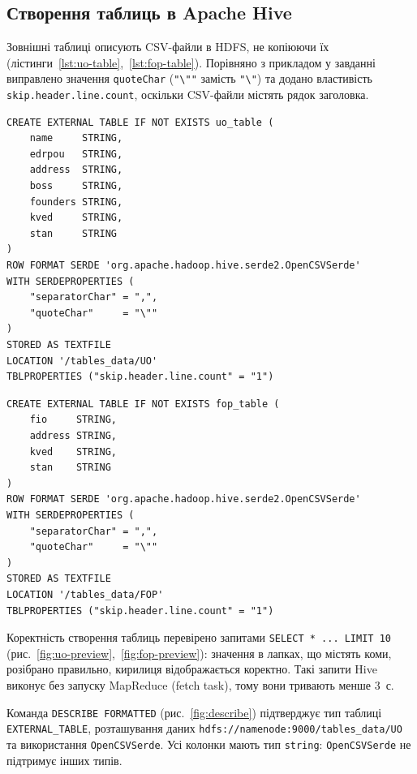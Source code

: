 \documentclass{iasa-lab}
\begin{document}

\subsection{Створення таблиць в Apache Hive}

Зовнішні таблиці описують CSV-файли в HDFS, не копіюючи їх (лістинги~\ref{lst:uo-table},~\ref{lst:fop-table}). Порівняно з прикладом у завданні виправлено значення \texttt{quoteChar} (\verb|"\""| замість \verb|"\"|) та додано властивість \texttt{skip.header.line.count}, оскільки CSV-файли містять рядок заголовка.

\begin{lstlisting}[language=HiveQL, caption={Створення зовнішньої таблиці uo\_table}, label={lst:uo-table}]
CREATE EXTERNAL TABLE IF NOT EXISTS uo_table (
    name     STRING,
    edrpou   STRING,
    address  STRING,
    boss     STRING,
    founders STRING,
    kved     STRING,
    stan     STRING
)
ROW FORMAT SERDE 'org.apache.hadoop.hive.serde2.OpenCSVSerde'
WITH SERDEPROPERTIES (
    "separatorChar" = ",",
    "quoteChar"     = "\""
)
STORED AS TEXTFILE
LOCATION '/tables_data/UO'
TBLPROPERTIES ("skip.header.line.count" = "1")
\end{lstlisting}

\begin{lstlisting}[language=HiveQL, caption={Створення зовнішньої таблиці fop\_table}, label={lst:fop-table}]
CREATE EXTERNAL TABLE IF NOT EXISTS fop_table (
    fio     STRING,
    address STRING,
    kved    STRING,
    stan    STRING
)
ROW FORMAT SERDE 'org.apache.hadoop.hive.serde2.OpenCSVSerde'
WITH SERDEPROPERTIES (
    "separatorChar" = ",",
    "quoteChar"     = "\""
)
STORED AS TEXTFILE
LOCATION '/tables_data/FOP'
TBLPROPERTIES ("skip.header.line.count" = "1")
\end{lstlisting}

Коректність створення таблиць перевірено запитами \texttt{SELECT * ... LIMIT 10} (рис.~\ref{fig:uo-preview},~\ref{fig:fop-preview}): значення в лапках, що містять коми, розібрано правильно, кирилиця відображається коректно. Такі запити Hive виконує без запуску MapReduce (fetch task), тому вони тривають менше 3~с.



Команда \texttt{DESCRIBE FORMATTED} (рис.~\ref{fig:describe}) підтверджує тип таблиці \texttt{EXTERNAL\_TABLE}, розташування даних \texttt{hdfs://namenode:9000/tables\_data/UO} та використання \texttt{OpenCSVSerde}. Усі колонки мають тип \texttt{string}: \texttt{OpenCSVSerde} не підтримує інших типів.
\end{document}

